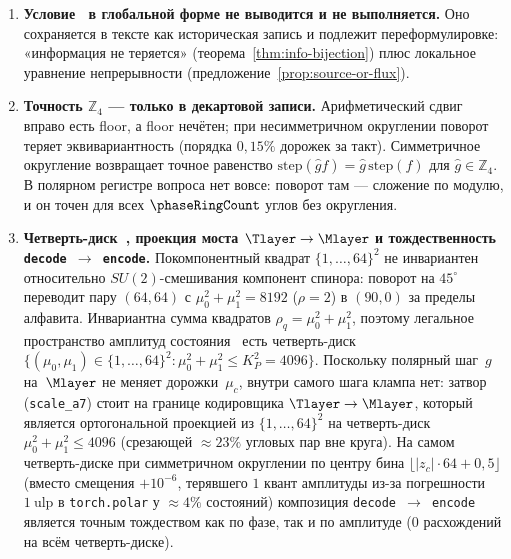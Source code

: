 \begin{enumerate}[leftmargin=*]
  где тот же угол $1/2\ \text{рад}$ равен $41$ тику). Именно эта несоизмеримость двух шкал ($32$ в Q3.6 против $41$ в $\mathbb{Z}_{512}$)
  вместе с потерей чётного дефицита $\delta\zeta_{\mathrm{real}}$~\eqref{eq:even-holonomy-phase} и второй компоненты спинора
  создавала иллюзию, будто гладкие волны и вихри «насыщаются на $32$ и не достают до $41$».
\item \textbf{Условие~ в глобальной форме не выводится и не выполняется.}
  Оно сохраняется в тексте как историческая запись и подлежит переформулировке:
  «информация не теряется» (теорема~\ref{thm:info-bijection}) плюс
  локальное уравнение непрерывности (предложение~\ref{prop:source-or-flux}).
\item \textbf{Точность $\mathbb{Z}_4$ — только в декартовой записи.}
  Арифметический сдвиг вправо есть floor, а floor нечётен; при несимметричном
  округлении поворот теряет эквивариантность (порядка $0{,}15\%$ дорожек за такт).
  Симметричное округление возвращает точное равенство
  $\mathrm{step}(\hat g f)=\hat g\,\mathrm{step}(f)$ для $\hat g\in\mathbb{Z}_4$.
  В полярном регистре вопроса нет вовсе: поворот там --- сложение по модулю,
  и он точен для всех $\phaseRingCount$ углов без округления.
\item \textbf{Четверть-диск~, проекция моста $\Tlayer\to\Mlayer$ и тождественность \texttt{decode\,$\to$\,encode}.}
  Покомпонентный квадрат $\{1,\dots,64\}^2$ не инвариантен относительно $SU(2)$-смешивания компонент спинора:
  поворот на $45^\circ$ переводит пару $(64,64)$ с $\mu_0^2+\mu_1^2 = 8192$ ($\rho = 2$) в $(90,0)$ за пределы алфавита.
  Инвариантна сумма квадратов $\rho_q = \mu_0^2 + \mu_1^2$, поэтому легальное пространство амплитуд состояния~
  есть четверть-диск $\{(\mu_0,\mu_1)\in\{1,\dots,64\}^2 : \mu_0^2 + \mu_1^2 \le K_P^2 = 4096\}$.
  Поскольку полярный шаг~$g$ на~$\Mlayer$ не меняет дорожки~$\mu_c$, внутри самого шага клампа нет:
  затвор~ (\texttt{scale\_a7}) стоит на границе кодировщика $\Tlayer\to\Mlayer$, который является
  ортогональной проекцией из $\{1,\dots,64\}^2$ на четверть-диск $\mu_0^2+\mu_1^2\le 4096$ (срезающей $\approx 23\%$ угловых пар вне круга).
  На самом четверть-диске при симметричном округлении по центру бина $\lfloor |z_c|\cdot 64 + 0{,}5\rfloor$ (вместо смещения $+10^{-6}$,
  терявшего $1$ квант амплитуды из-за погрешности $1\ \mathrm{ulp}$ в \texttt{torch.polar} у $\approx 4\%$ состояний)
  композиция \texttt{decode\,$\to$\,encode} является точным тождеством как по фазе, так и по амплитуде ($0$ расхождений на всём четверть-диске).

\end{enumerate}
